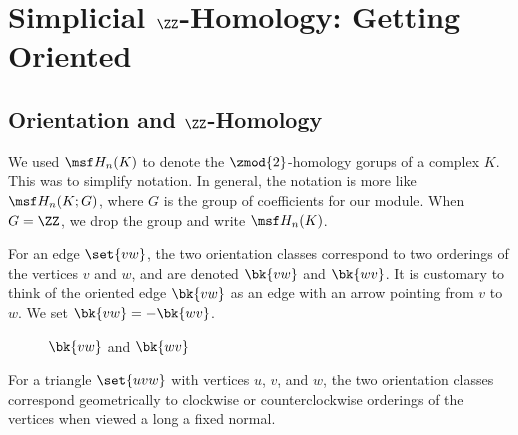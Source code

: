 \chapter[$\ZZ$ Homology]{Simplicial $\ZZ$-Homology: Getting Oriented}
\section{Orientation and $\ZZ$-Homology}
\begin{note}
  We used $\msf H_n(K)$ to denote the $\zmod{2}$-homology gorups of a
  complex $K$. This was to simplify notation. In general, the notation
  is more like $\msf H_n(K; G)$, where $G$ is the group of
  coefficients for our module. When $G=\ZZ$, we drop the group and
  write $\msf H_n(K)$.
\end{note}

\begin{definition}
  For an edge $\set{vw}$, the two orientation classes correspond to
  two orderings of the vertices $v$ and $w$, and are denoted $\bk{vw}$
  and $\bk{wv}$. It is customary to think of the oriented edge
  $\bk{vw}$ as an edge with an arrow pointing from $v$ to $w$. We set
  $\bk{vw} = -\bk{wv}$.
\end{definition}
\begin{figure}[h]
  \centering
  \caption{$\bk{vw}$ and $\bk{wv}$}
\end{figure}

\begin{definition}
  For a triangle $\set{uvw}$ with vertices $u$, $v$, and $w$, the two
  orientation classes correspond geometrically to clockwise or
  counterclockwise orderings of the vertices when viewed a long a
  fixed normal.
\end{definition}

